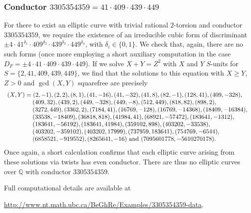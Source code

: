 \subsubsection{Conductor $3305354359 = 41 \cdot 409 \cdot 439 \cdot 449$}

For there to exist an elliptic curve with trivial rational $2$-torsion and conductor $3305354359$, we require the existence of an irreducible cubic form of discriminant $\pm 4  \cdot 41^{\delta_1} \cdot 409^{\delta_2} \cdot 439^{\delta_3} \cdot 449^{\delta_4}$, with $\delta_i \in \{ 0, 1 \}$. We check that, again, there are no such forms (once more employing a short auxiliary computation in the case $D_F =\pm 4  \cdot 41 \cdot 409 \cdot 439 \cdot 449$). If we solve $X+Y=Z^2$ with $X$ and $Y$ $S$-units for $S = \{ 2, 41, 409, 439, 449 \}$, we find that the solutions to this equation with $X \geq Y$, $Z > 0$ and $\gcd (X,Y)$ squarefree are precisely 
$$
\begin{array}{l}
(X,Y) =  (2,-1), (2,2), (8,1), (41,-16),  (41,-32), (41,8), (82,-1), (128,41), ( 409, -328),  \\
 \hskip9.6ex (409, 32), (439, 2), (449, -328), (449, -8), (512, 449), (818, 82), (898, 2), \\
\hskip9.6ex   (3272, 449), (3362, 2), (7184, 41), (16769, -128), (16769, -14368),  (18409, -16384), \\
 \hskip9.6ex  (33538, -18409), (36818, 818), (41984, 41), (68921, -57472), (183641, -1312),\\
\hskip9.6ex   (183641, -56192), (183641, 41984), (359102, 898), (403202, -33538), \\
\hskip9.6ex   (403202, -359102), (403202, 17999), (737959, 183641), (754769, -6544), \\
\hskip9.6ex  (6858521, -919552), (8265641, -16) \mbox{ and } (7095601778, -5610270178). \\
\end{array}
$$
Once again, a short calculation confirms that each elliptic curve arising from these solutions via twists has even conductor. There are thus no elliptic curves over $\mathbb{Q}$ with conductor $3305354359$.

Full computational details are available at
\begin{center}
\url{http://www.nt.math.ubc.ca/BeGhRe/Examples/3305354359-data}.
\end{center}

